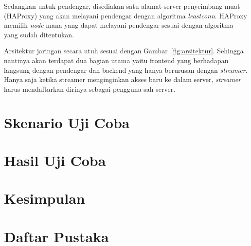 \documentclass[conference]{IEEEtran}
\begin{document}
	\indent
	Sedangkan untuk pendengar, disediakan satu alamat server penyeimbang muat (HAProxy) yang akan melayani pendengar dengan algoritma \textit{leastconn}. HAProxy memilih \textit{node} mana yang dapat melayani pendengar sesuai dengan algoritma yang sudah ditentukan. 
	
	\indent
	Arsitektur jaringan secara utuh sesuai dengan Gambar~\ref{fig:arsitektur}. Sehingga nantinya akan terdapat dua bagian utama yaitu frontend yang berhadapan langsung dengan pendengar dan backend yang hanya berurusan dengan \textit{streamer}. Hanya saja ketika streamer menginginkan akses baru ke dalam server, \textit{streamer} harus mendaftarkan dirinya sebagai pengguna sah server.
	
	

	

	
	\section{Skenario Uji Coba}
	
	\section{Hasil Uji Coba}
	
	\section{Kesimpulan}
	
	\section{Daftar Pustaka}
\end{document}
